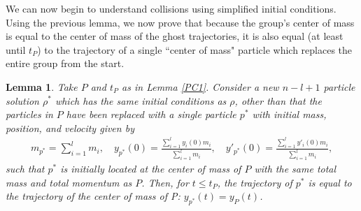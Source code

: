 \documentclass[11pt]{article}
\newtheorem{lemma}[theorem]{Lemma}
\numberwithin{equation}{section}
\begin{document}
    We can now begin to understand collisions using simplified initial conditions. Using the previous lemma, we now prove that because the group's center of mass is equal to the center of mass of the ghost trajectories, it is also equal (at least until $t_P$) to the trajectory of a single ``center of mass" particle which replaces the entire group from the start. 
    \begin{lemma} \label{PC2}
        Take $P$ and $t_P$ as in Lemma \ref{PC1}. Consider a new $n-l+1$ particle  solution $\rho^*$ which has the same initial conditions as $\rho$, other than that the particles in $P$ have been replaced with a single particle  $p^*$ with initial mass, position, and velocity given by    
        \begin{align*}
            m_{p^*}=\sum_{i=1}^{l}m_i, \quad y_{p^*}(0)=\frac{\sum_{i=1}^{l}y_i(0)m_i}{\sum_{i=1}^{l}m_i}, \quad y'_{p^*}(0)=\frac{\sum_{i=1}^{l}y'_i(0)m_i}{\sum_{i=1}^{l}m_i},
        \end{align*}
        such that $p^*$ is initially located at the center of mass of $P$ with the same total mass and total momentum as $P$. Then, for $t \le t_P$, the trajectory of $p^*$ is equal to the trajectory of the center of mass of P: $y_{p^*}(t)=y_P(t)$.
    \end{lemma}
\end{document}
